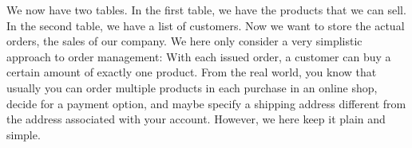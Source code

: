 %
\label{sec:factory:demand}%
%
We now have two tables.
In the first table, we have the products that we can sell.
In the second table, we have a list of customers.
Now we want to store the actual orders, the sales of our company.
We here only consider a very simplistic approach to order management:
With each issued order, a customer can buy a certain amount of exactly one product.
From the real world, you know that usually you can order multiple products in each purchase in an online shop, decide for a payment option, and maybe specify a shipping address different from the address associated with your account.
However, we here keep it plain and simple.%
%
%
%
%
\FloatBarrier%
\endhsection%
%
